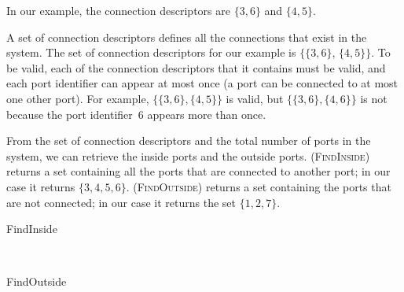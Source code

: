 In our example, the connection descriptors are $\lbrace 3, 6 \rbrace$ and $\lbrace 4, 5 \rbrace$.

A set of connection descriptors defines all the connections that exist in the system.
The set of connection descriptors for our example is
$\lbrace \lbrace 3, 6 \rbrace$, $\lbrace 4, 5 \rbrace \rbrace$.
To be valid, each of the connection descriptors that it contains must be valid, and each port identifier can appear at most once (a port can be connected to at most one other port).
For example,
$\lbrace \lbrace 3, 6 \rbrace, \lbrace 4, 5 \rbrace \rbrace$
is valid, but 
$\lbrace \lbrace 3, 6 \rbrace, \lbrace 4, 6 \rbrace \rbrace$
is not because the port identifier~6 appears more than once.

From the set of connection descriptors and the total number of ports in the system, we can retrieve the inside ports and the outside ports.
 (\textsc{FindInside}) returns a set containing all the ports that are connected to another port; in our case it returns $\lbrace 3, 4, 5, 6 \rbrace$.
 (\textsc{FindOutside}) returns a set containing the ports that are not connected; in our case it returns the set $\lbrace 1, 2, 7 \rbrace$.

\begin{algorithm}[hbtp]
    \caption{FindInside}
    \label{algo:find_inside}
    \begin{algorithmic}
         
        \EndFor
        \\  
        \EndFunction
    \end{algorithmic}
\end{algorithm}

\begin{algorithm}[hbtp]
    \caption{FindOutside}
    \label{algo:find_outside}
    \begin{algorithmic}
         
         
        \\  
        \EndFunction
    \end{algorithmic}
\end{algorithm}



